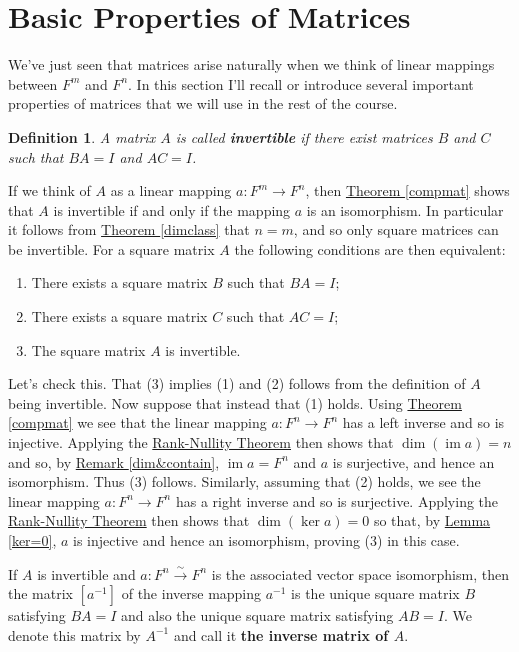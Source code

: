 \documentclass[11pt]{amsbook}
\DeclareMathOperator{\im}{\mathrm{im}}
\newtheorem{definition}[theorem]{Definition}
\theoremstyle{definition}
\begin{document}
\section{Basic Properties of Matrices}\label{basicmat}
We've just seen that matrices arise naturally when we think of linear mappings between $F^m$ and $F^n$. In this section I'll recall or introduce several important properties of matrices that we will use in the rest of the course.
\begin{definition}\label{defmatinv}
A matrix $A$ is called {\bf invertible} if there exist matrices $B$ and $C$ such that $BA = I$ and $AC = I$.
\end{definition}
If we think of $A$ as a linear mapping $a: F^m \to F^n$, then \hyperref[compmat]{Theorem \ref{compmat}} shows that $A$ is invertible if and only if the mapping $a$ is an isomorphism. In particular it follows from \hyperref[dimclass]{Theorem \ref{dimclass}} that $n=m$, and so only square matrices can be invertible. For a square matrix $A$ the following conditions are then equivalent:
\begin{enumerate}
\item There exists a square matrix $B$ such that $BA = I$;
\item There exists a square matrix $C$ such that $AC = I$;
\item The square matrix $A$ is invertible.
\end{enumerate}
Let's check this. That (3) implies (1) and (2) follows from the definition of $A$ being invertible. Now suppose that instead that (1) holds. Using \hyperref[compmat]{Theorem \ref{compmat}} we see that the linear mapping $a:F^n \to F^n$ has a left inverse and so is injective. Applying the \hyperref[rnthm]{Rank-Nullity Theorem} then shows that $\dim(\im a) = n$ and so, by \hyperref[dim&contain]{Remark \ref{dim&contain}}, $\im a = F^n$ and $a$ is surjective, and hence an isomorphism. Thus (3) follows. Similarly, assuming that (2) holds, we see the linear mapping $a:F^n \to F^n$ has a right inverse and so is surjective. Applying the \hyperref[rnthm]{Rank-Nullity Theorem} then shows that  $\dim (\ker a) = 0$ so that, by \hyperref[ker=0]{Lemma \ref{ker=0}}, $a$ is injective and hence an isomorphism, proving (3) in this case.

\label{GLn}
If $A$ is invertible and $a: F^n\stackrel{\sim}{\to} F^n$ is the associated vector space isomorphism, then the matrix $[a^{-1}]$ of the inverse mapping $a^{-1}$ is the unique square matrix $B$ satisfying $BA = I$ and also the unique square matrix satisfying $AB = I$. We denote this matrix by $A^{-1}$ and call it {\bf the inverse matrix of $A$}.
\end{document}
